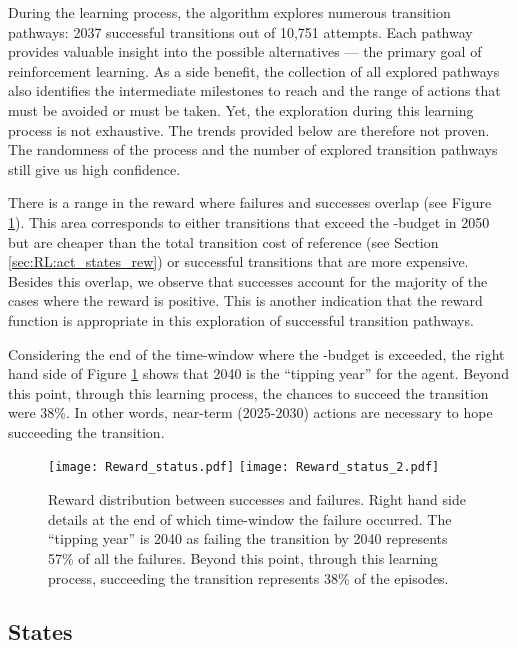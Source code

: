 During the learning process, the algorithm explores numerous transition pathways: 2037 successful transitions out of 10,751 attempts. Each pathway provides valuable insight into the possible alternatives --- the primary goal of reinforcement learning. As a side benefit, the collection of all explored pathways also identifies the intermediate milestones to reach and the range of actions that must be avoided or must be taken. Yet, the exploration during this learning process is not exhaustive. The trends provided below are therefore not proven. The randomness of the process and the number of explored transition pathways still give us high confidence.

There is a range in the reward where failures and successes overlap (see Figure \ref{fig:reward_status}). This area corresponds to either transitions that exceed the -budget in 2050 but are cheaper than the total transition cost of reference (see Section \ref{sec:RL:act_states_rew}) or successful transitions that are more expensive. Besides this overlap, we observe that successes account for the majority of the cases where the reward is positive. This is another indication that the reward function is appropriate in this exploration of successful transition pathways.

Considering the end of the time-window where the -budget is exceeded, the right hand side of Figure \ref{fig:reward_status} shows that 2040 is the ``tipping year'' for the agent. Beyond this point, through this learning process, the chances to succeed the transition were 38\%. In other words, near-term (2025-2030) actions are necessary to hope succeeding the transition.

\begin{figure}[!htbp]
\centering
\texttt{[image: Reward\_status.pdf]}
\texttt{[image: Reward\_status\_2.pdf]}
\caption{Reward distribution between successes and failures. Right hand side details at the end of which time-window the failure occurred. The ``tipping year'' is 2040 as failing the transition by 2040 represents 57\% of all the failures. Beyond this point, through this learning process, succeeding the transition represents 38\% of the episodes.}
\label{fig:reward_status}
\end{figure}

\subsection{States}
\label{subsec:RL:learning:states}

